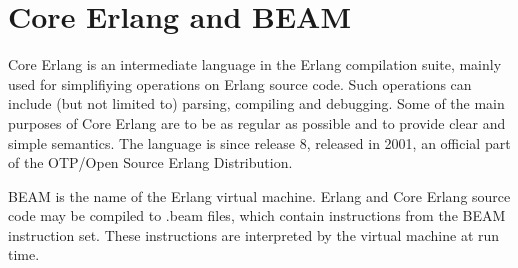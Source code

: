 \section{Core Erlang and BEAM}

Core Erlang \cite{CoreErlangIntro} is an intermediate language in the Erlang compilation suite, mainly used for simplifiying operations on Erlang source code. Such operations can include (but not limited to) parsing, compiling and debugging. Some of the main purposes of Core Erlang are to be as regular as possible and to provide clear and simple semantics. The language is since release 8, released in 2001, an official part of the OTP/Open Source Erlang Distribution.

BEAM is the name of the Erlang virtual machine. Erlang and Core Erlang source code may be compiled to .beam files, which contain instructions from the BEAM instruction set. These instructions are interpreted by the virtual machine at run time.